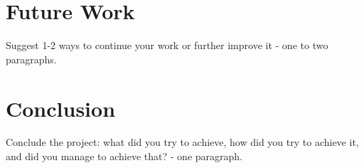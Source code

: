\documentclass{acmart}
\begin{document}
\section{Future Work}
Suggest 1-2 ways to continue your work or further improve it - one to two paragraphs.

\section{Conclusion}
Conclude the project: what did you try to achieve, how did you try to achieve it, and did you manage to achieve that? - one paragraph.



\end{document}
